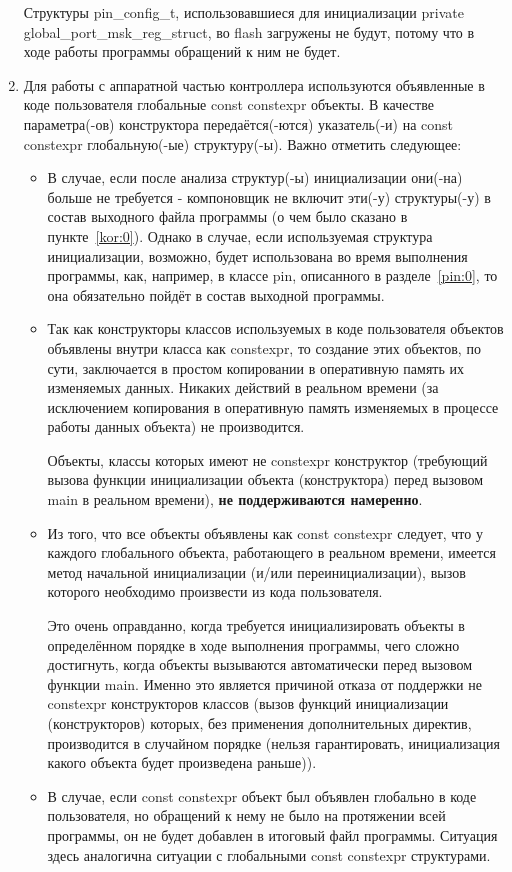 \begin{enumerate}
	Структуры pin\_\-config\_\-t, использовавшиеся для инициализации private global\_\-port\_\-msk\_\-reg\_\-struct, во flash загружены не будут, потому что в ходе работы программы обращений к ним не будет.
	\label{kor:0}
	\item Для работы с аппаратной частью контроллера используются объявленные в коде пользователя глобальные const constexpr объекты. В качестве параметра(-ов) конструктора передаётся(-ются) указатель(-и) на const constexpr глобальную(-ые) структуру(-ы). Важно отметить следующее:
	\begin{itemize}
		\item В случае, если после анализа структур(-ы) инициализации они(-на) больше не требуется - компоновщик не включит эти(-у) структуры(-у) в состав выходного файла программы (о чем было сказано в пункте~\ref{kor:0}). Однако в случае, если используемая структура инициализации, возможно, будет использована во время выполнения программы, как, например, в классе pin, описанного в разделе~\ref{pin:0}, то она обязательно пойдёт в состав выходной программы.
		\item Так как конструкторы классов используемых в коде пользователя объектов объявлены внутри класса как constexpr, то создание этих объектов, по сути, заключается в простом копировании в оперативную память их изменяемых данных. Никаких действий в реальном времени (за исключением копирования в оперативную память изменяемых в процессе работы данных объекта) не производится.
		
		Объекты, классы которых имеют не constexpr конструктор (требующий вызова функции инициализации  объекта (конструктора) перед вызовом main в реальном времени), \textbf{не поддерживаются намеренно}.
		\item Из того, что все объекты объявлены как const constexpr следует, что у каждого глобального объекта, работающего в реальном времени, имеется метод начальной инициализации (и/или переинициализации), вызов которого необходимо произвести из кода пользователя. 
		
		Это очень оправданно, когда требуется инициализировать объекты в определённом порядке в ходе выполнения программы, чего сложно достигнуть, когда объекты вызываются автоматически перед вызовом функции main. Именно это является причиной отказа от поддержки не constexpr конструкторов классов (вызов функций инициализации (конструкторов) которых, без применения дополнительных директив, производится в случайном порядке (нельзя гарантировать, инициализация какого объекта будет произведена раньше)).
		
		\item В случае, если const constexpr объект был объявлен глобально в коде пользователя, но обращений к нему не было на протяжении всей программы, он не будет добавлен в итоговый файл программы. Ситуация здесь аналогична ситуации с глобальными const constexpr структурами.
	\end{itemize}
\end{enumerate}


\label{gp:0}				%
\label{pin:0}				%
